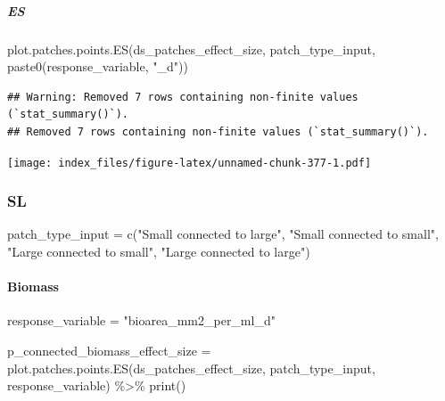 \documentclass[
]{article}
\newenvironment{Shaded}{\begin{snugshade}}{\end{snugshade}}
\newcommand{\FunctionTok}[1]{\textcolor[rgb]{0.00,0.00,0.00}{#1}}
\newcommand{\NormalTok}[1]{#1}
\newcommand{\OtherTok}[1]{\textcolor[rgb]{0.56,0.35,0.01}{#1}}
\newcommand{\SpecialCharTok}[1]{\textcolor[rgb]{0.00,0.00,0.00}{#1}}
\newcommand{\StringTok}[1]{\textcolor[rgb]{0.31,0.60,0.02}{#1}}
\begin{document}
\hypertarget{es-16}{%
\subparagraph{ES}\label{es-16}}

\begin{Shaded}
\begin{Highlighting}[]
\FunctionTok{plot.patches.points.ES}\NormalTok{(ds\_patches\_effect\_size, patch\_type\_input,}
                       \FunctionTok{paste0}\NormalTok{(response\_variable, }\StringTok{"\_d"}\NormalTok{))}
\end{Highlighting}
\end{Shaded}

\begin{verbatim}
## Warning: Removed 7 rows containing non-finite values (`stat_summary()`).
## Removed 7 rows containing non-finite values (`stat_summary()`).
\end{verbatim}

\texttt{[image: index\_files/figure-latex/unnamed-chunk-377-1.pdf]}

\hypertarget{sl}{%
\subsubsection{SL}\label{sl}}

\begin{Shaded}
\begin{Highlighting}[]
\NormalTok{patch\_type\_input }\OtherTok{=} \FunctionTok{c}\NormalTok{(}\StringTok{"Small connected to large"}\NormalTok{,}
                     \StringTok{"Small connected to small"}\NormalTok{,}
                     \StringTok{"Large connected to small"}\NormalTok{,}
                     \StringTok{"Large connected to large"}\NormalTok{)}
\end{Highlighting}
\end{Shaded}

\hypertarget{biomass-7}{%
\paragraph{Biomass}\label{biomass-7}}

\begin{Shaded}
\begin{Highlighting}[]
\NormalTok{response\_variable }\OtherTok{=} \StringTok{"bioarea\_mm2\_per\_ml\_d"}
\end{Highlighting}
\end{Shaded}

\begin{Shaded}
\begin{Highlighting}[]
\NormalTok{p\_connected\_biomass\_effect\_size }\OtherTok{=} \FunctionTok{plot.patches.points.ES}\NormalTok{(ds\_patches\_effect\_size, }
\NormalTok{                                                         patch\_type\_input,}
\NormalTok{                                                         response\_variable) }\SpecialCharTok{\%\textgreater{}\%}
  \FunctionTok{print}\NormalTok{()}
\end{Highlighting}
\end{Shaded}
\end{document}
